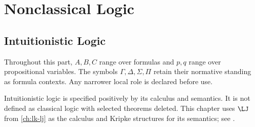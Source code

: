 \part{Nonclassical Logic}
\label{part:nonclassical}

\chapter{Intuitionistic Logic}
\label{ch:intuitionistic-logic}

\begin{convention}
Throughout this part, \(A,B,C\) range over formulas and \(p,q\) range over
propositional variables.  The symbols \(\Gamma,\Delta,\Sigma,\Pi\) retain their
normative standing as formula contexts.  Any narrower local role is declared
before use.
\end{convention}

Intuitionistic logic is specified positively by its calculus and semantics.  It
is not defined as classical logic with selected theorems deleted.  This chapter
uses \(\LJ\) from \cref{ch:lk-lj} as the calculus and Kripke
structures for its semantics; see
\cite{Kripke1965,TroelstraSchwichtenberg2000}.

